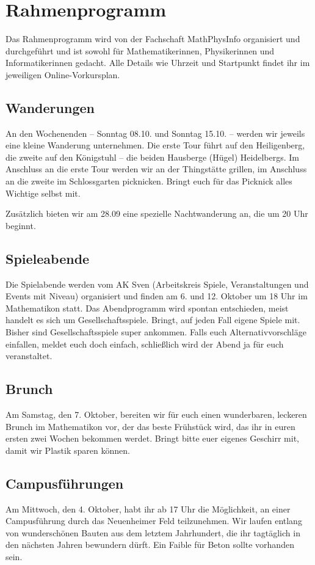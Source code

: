 \newpage
\section{Rahmenprogramm}

Das Rahmenprogramm wird von der Fachschaft MathPhysInfo organisiert und durchgeführt und ist sowohl für Mathematikerinnen, Physikerinnen und Informatikerinnen gedacht. Alle Details wie Uhrzeit und Startpunkt findet ihr im jeweiligen Online-Vorkursplan.

\subsection{Wanderungen}
An den Wochenenden -- Sonntag 08.10. und Sonntag 15.10. -- werden wir jeweils eine kleine Wanderung unternehmen. Die erste Tour führt auf den Heiligenberg, die zweite auf den Königstuhl -- die beiden Hausberge (Hügel) Heidelbergs. Im Anschluss an die erste Tour werden wir an der Thingstätte grillen, im Anschluss an die zweite im Schlossgarten picknicken. Bringt euch für das Picknick alles Wichtige selbst mit.

Zusätzlich bieten wir am 28.09 eine spezielle Nachtwanderung an, die um 20 Uhr beginnt.

\subsection{Spieleabende}
Die Spielabende werden vom AK Sven (Arbeitskreis Spiele, Veranstaltungen und Events mit Niveau) organisiert und finden am 6. und 12. Oktober um 18 Uhr im \gls{Mathematikon} statt. Das Abendprogramm wird spontan entschieden, meist handelt es sich um Gesellschaftsspiele. Bringt, auf jeden Fall eigene Spiele mit. Bisher sind Gesellschaftsspiele super ankommen. Falls euch Alternativvorschläge einfallen, meldet euch doch einfach, schließlich wird der Abend ja für euch veranstaltet.

\subsection{Brunch}
Am Samstag, den 7. Oktober, bereiten wir für euch einen wunderbaren, leckeren Brunch im \gls{Mathematikon} vor, der das beste Frühstück wird, das ihr in euren ersten zwei Wochen bekommen werdet. Bringt bitte euer eigenes Geschirr mit, damit wir Plastik sparen können.

\subsection{Campusführungen}
Am Mittwoch, den 4. Oktober, habt ihr ab 17 Uhr die Möglichkeit, an einer Campusführung durch das Neuenheimer Feld teilzunehmen. Wir laufen entlang von wunderschönen Bauten aus dem letztem Jahrhundert, die ihr tagtäglich in den nächsten Jahren bewundern dürft. Ein Faible für Beton sollte vorhanden sein.

